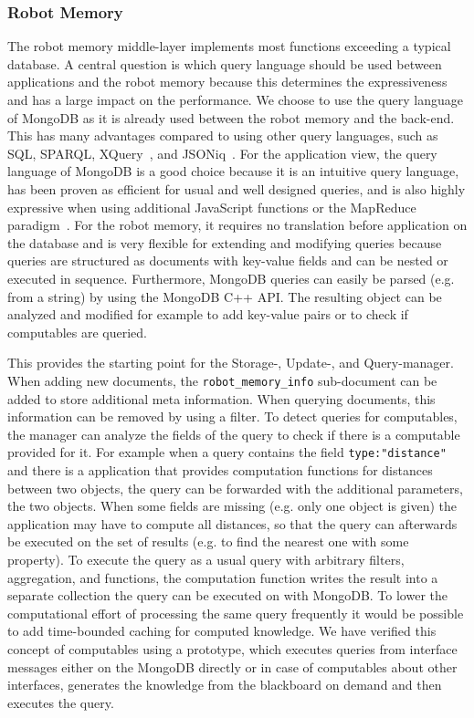 \documentclass[a4paper,11pt]{article}
\begin{document}
\subsubsection{Robot Memory}
\label{sec:impl-memory}
The robot memory middle-layer implements most functions exceeding a
typical database.
A central question is which query language should be used between
applications and the robot memory because this determines the
expressiveness and has a large impact on the performance. We choose to
use the query language of MongoDB as it is already used between the
robot memory and the back-end. This has many advantages compared to
using other query languages, such as SQL, SPARQL,
XQuery~\cite{query-languages}, and JSONiq~\cite{jsoniq}.
%
For the application view, the query language of MongoDB is a good
choice because it is an intuitive query language, has been proven as
efficient for usual and well designed queries, and is also highly
expressive when using additional JavaScript functions or the MapReduce
paradigm~\cite{mongodb,RoboDB}. For the robot memory, it requires no
translation before application on the database and is very flexible
for extending and modifying queries because queries are structured as
documents with key-value fields and can be nested or executed in
sequence. Furthermore, MongoDB queries can easily be parsed (e.g. from
a string) by using the MongoDB C++ API. The resulting object can be
analyzed and modified for example to add key-value pairs or to check
if computables are queried.

This provides the starting point for the Storage-, Update-, and
Query-manager. When adding new documents, the
\texttt{robot\_memory\_info} sub-document can be added to store
additional meta information. When querying documents, this information
can be removed by using a filter. To detect queries for computables,
the manager can analyze the fields of the query to check if there is a
computable provided for it.  For example when a query contains the
field \texttt{type:"distance"} and there is a application that
provides computation functions for distances between two objects, the
query can be forwarded with the additional parameters, the two
objects.  When some fields are missing (e.g. only one object is given)
the application may have to compute all distances, so that the query
can afterwards be executed on the set of results (e.g. to find the
nearest one with some property). To execute the query as a usual query
with arbitrary filters, aggregation, and functions, the computation
function writes the result into a separate collection the query
can be executed on with MongoDB. To lower the computational effort of
processing the same query frequently it would be possible to add
time-bounded caching for computed knowledge. We have verified this
concept of computables using a prototype, which executes queries from
interface messages either on the MongoDB directly or in case of
computables about other interfaces, generates the knowledge from the
blackboard on demand and then executes the query.
\end{document}
